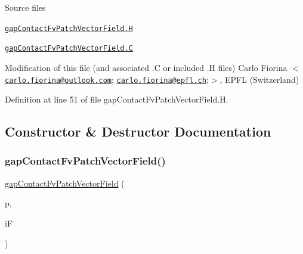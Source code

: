 \label{_Description}%
 \begin{DoxyParagraph}{Source files}

\begin{DoxyItemize}
\item \href{../../../home/carlo/data/GeN-Foam/GeN-Foam_ffn/GeN-Foam/GeN-Foam/classes/thermoMechanics/tractionDisplacement/gapContactFvPatchVectorField.H}{\tt gap\+Contact\+Fv\+Patch\+Vector\+Field.\+H} 
\item \href{../../../home/carlo/data/GeN-Foam/GeN-Foam_ffn/GeN-Foam/GeN-Foam/classes/thermoMechanics/tractionDisplacement/gapContactFvPatchVectorField.C}{\tt gap\+Contact\+Fv\+Patch\+Vector\+Field.\+C} 
\end{DoxyItemize}Modification of this file (and associated .C or included .H files) Carlo Fiorina $<$\href{mailto:carlo.fiorina@outlook.com}{\tt carlo.\+fiorina@outlook.\+com}; \href{mailto:carlo.fiorina@epfl.ch}{\tt carlo.\+fiorina@epfl.\+ch};$>$, E\+P\+FL (Switzerland) 
\end{DoxyParagraph}


Definition at line 51 of file gap\+Contact\+Fv\+Patch\+Vector\+Field.\+H.



\subsection{Constructor \& Destructor Documentation}
\mbox{\label{classFoam_1_1gapContactFvPatchVectorField_a1b260509dca8e2b01322d76e168fcd90}} 
\subsubsection{\texorpdfstring{gap\+Contact\+Fv\+Patch\+Vector\+Field()}{gapContactFvPatchVectorField()}\hspace{0.1cm}{\footnotesize\ttfamily [1/5]}}
{\footnotesize\ttfamily \hyperlink{classFoam_1_1gapContactFvPatchVectorField}{gap\+Contact\+Fv\+Patch\+Vector\+Field} (\begin{DoxyParamCaption}\item[{const fv\+Patch \&}]{p,  }\item[{const Dimensioned\+Field$<$ vector, vol\+Mesh $>$ \&}]{iF }\end{DoxyParamCaption})}



